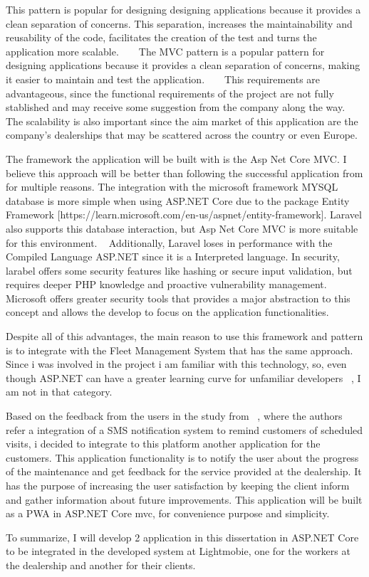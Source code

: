 This pattern is popular for designing designing applications because it provides a clean separation of concerns. This separation, increases the maintainability and reusability of the code, facilitates the creation of the test and turns the application more scalable. ~\cite{mvc_geeksforgeeks} ~\cite{MVC_StartupHouse}
The \ac{MVC} pattern is a popular pattern for designing applications because it provides a clean separation of concerns, making it easier to maintain and test the application. ~\cite{mvc_geeksforgeeks} ~\cite{MVC_StartupHouse}
This requirements are advantageous, since the functional requirements of the project are not fully stablished and may receive some suggestion from the company along the way. 
The scalability is also important since the aim market of this application are the company's dealerships that may be scattered across the country or even Europe.

The framework the application will be built with is the Asp Net Core MVC. 
I believe this approach will be better than following the successful application from \citet{MAS_MOTORS} for multiple reasons.
The integration with the microsoft framework MYSQL database is more simple when using ASP.NET Core due to the package Entity Framework [https://learn.microsoft.com/en-us/aspnet/entity-framework]. 
Laravel also supports this database interaction, but Asp Net Core MVC is more suitable for this environment. ~\cite{asp_net_vs_laravel}
Additionally, Laravel loses in performance with the Compiled Language ASP.NET since it is a Interpreted language. 
In security, larabel offers some security features like hashing or secure input validation, but requires deeper PHP knowledge and proactive vulnerability management. 
Microsoft offers greater security tools that provides a major abstraction to this concept and allows the develop to focus on the application functionalities. ~\cite{asp_net_vs_laravel}

Despite all of this advantages, the main reason to use this framework and pattern is to integrate with the Fleet Management System that has the same approach. 
Since i was involved in the project i am familiar with this technology, so, even though ASP.NET can have a greater learning curve for unfamiliar developers ~\cite{asp_net_vs_laravel}, I am not in that category.

Based on the feedback from the users in the study from ~\citet{MAS_MOTORS}, where the authors refer a integration of a SMS notification system to remind customers of scheduled visits, i decided to integrate to this platform another application for the customers. 
This application functionality is to notify the user about the progress of the maintenance and get feedback for the service provided at the dealership.
It has the purpose of increasing the user satisfaction by keeping the client inform and gather information about future improvements.
This application will be built as a \ac{PWA} in ASP.NET Core mvc, for convenience purpose and simplicity.

To summarize, I will develop 2 application in this dissertation in ASP.NET Core to be integrated in the developed system at Lightmobie, one for the workers at the dealership and another for their clients.







